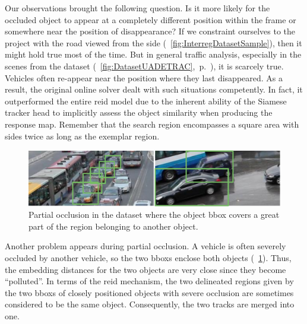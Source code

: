 Our observations brought the following question. Is it more likely for the occluded object to appear at a completely different position within the frame or somewhere near the position of disappearance? If we constraint ourselves to the \interreg{} project with the road viewed from the side (\figtext{}~\ref{fig:InterregDatasetSample}), then it might hold true most of the time. But in general traffic analysis, especially in the scenes from the \uadetrac{} dataset (\figtext{}~\ref{fig:DatasetUADETRAC},~p.~\pageref{fig:DatasetUADETRAC}), it is scarcely true. Vehicles often re-appear near the position where they last disappeared. As a result, the original online solver dealt with such situations competently. In fact, it outperformed the entire \gls{reid} model due to the inherent ability of the Siamese tracker head to implicitly assess the object similarity when producing the response map. Remember that the search region encompasses a square area with sides twice as long as the exemplar region.

\begin{figure}[!t]
    \centering
    \includegraphics[width=\linewidth]{figures/siamese_tracking/uadetrac_partial_occlusion_multiple_cars.pdf}
    \caption[Partial occlusion in \uadetrac{} dataset]{Partial occlusion in the \uadetrac{} dataset where the object \gls{bbox} covers a great part of the region belonging to another object.}
    \label{fig:UADETRACPartialOcclusionMultiple}
\end{figure}

Another problem appears during partial occlusion. A vehicle is often severely occluded by another vehicle, so the two \glspl{bbox} enclose both objects (\figtext{}~\ref{fig:UADETRACPartialOcclusionMultiple}). Thus, the embedding distances for the two objects are very close since they become ``polluted''. In terms of the \gls{reid} mechanism, the two delineated regions given by the two \glspl{bbox} of closely positioned objects with severe occlusion are sometimes considered to be the same object. Consequently, the two tracks are merged into one.


